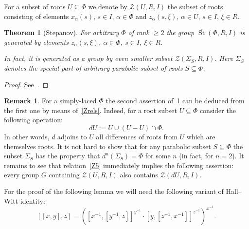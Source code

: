 \documentclass[oneside, 8pt]{amsart}
\newtheorem{theorem}{Theorem}
\theoremstyle{remark}
\theoremstyle{definition}
\newtheorem{rem}[lemma]{Remark}
\DeclareMathOperator{\St}{St}
\numberwithin{equation}{section}
\begin{document}
For a subset of roots $U \subseteq \Phi$ we denote by $\mathcal{Z}(U, R, I)$ the subset of roots consisting of elements $x_\alpha(s)$, $s \in I$, $\alpha \in \Phi$ and $z_\alpha(s, \xi)$, $\alpha \in U$, $s\in I$, $\xi \in R$.

\begin{theorem}[Stepanov] \label{thm:Stepanov} For arbitrary $\Phi$ of rank $\geq 2$ the group $\overline{\St}(\Phi, R, I)$ is generated by elements $z_\alpha(s, \xi)$, $\alpha \in \Phi$, $s \in I$, $\xi \in R$.

In fact, it is generated as a group by even smaller subset $\mathcal{Z}(\Sigma_S, R, I)$. Here $\Sigma_S$ denotes the special part of arbitrary parabolic subset of roots $S \subseteq \Phi$.
\end{theorem} \begin{proof} See~\cite[Lemma~4]{S15}. \end{proof}

\begin{rem} For a simply-laced $\Phi$ the second assertion of~\cref{thm:Stepanov} can be deduced from the first one by means of~\cref{Zrels}. Indeed, for a root subset $U\subseteq \Phi$ consider the following operation: \[dU := U \cup (U - U)\cap \Phi.\] In other words, $d$ adjoins to $U$ all differences of roots from $U$ which are themselves roots. It is not hard to show that for any parabolic subset $S \subseteq \Phi$ the subset $\Sigma_S$ has the property that $d^n(\Sigma_S) = \Phi$ for some $n$ (in fact, for $n=2$). It remains to see that relation~\eqref{Z5} immediately implies the following assertion: every group $G$ containing $\mathcal{Z}(U, R, I)$ also contains $\mathcal{Z}(dU, R, I)$. \end{rem}

For the proof of the following lemma we will need the following variant of Hall--Witt identity:
\begin{equation} \label{HW-variant} [[x, y], z] = \left([x^{-1}, [ y^{-1}, z]] ^ {y^{-1}} \cdot [y, [ z^{-1}, x^{-1}]] ^ {z^{-1}} \right)^{x^{-1}}.\end{equation}
\end{document}

